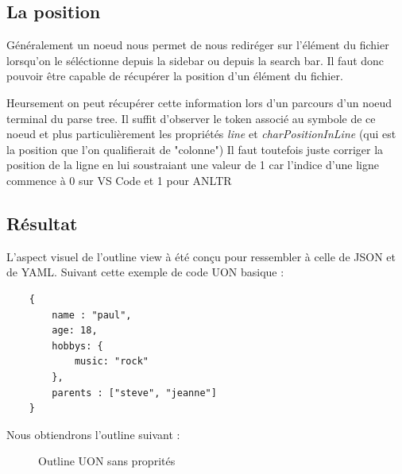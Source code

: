 \documentclass[
    iict, %
    il, %
]{heig-tb}
\begin{document}
\subsection{La position}

Généralement un noeud nous permet de nous rediréger sur l'élément du fichier lorsqu'on le séléctionne depuis la sidebar ou depuis la search bar. %
Il faut donc pouvoir être capable de récupérer la position d'un élément du fichier.

Heursement on peut récupérer cette information lors d'un parcours d'un noeud terminal du parse tree.
Il suffit d'observer le token associé au symbole de ce noeud et plus particulièrement les
propriétés \emph{line} et \emph{charPositionInLine} (qui est la position que l'on qualifierait de "colonne")
Il faut toutefois juste corriger la position de la ligne en lui soustraiant une valeur de 1 car l'indice d'une ligne commence à 0 sur VS Code et 1 pour ANLTR %

\subsection{Résultat}
L'aspect visuel de l'outline view à été conçu pour ressembler à celle de JSON et de YAML.
Suivant cette exemple de code UON basique :

\begin{lstlisting}
    {
        name : "paul",
        age: 18,
        hobbys: {
            music: "rock"
        },
        parents : ["steve", "jeanne"]
    }
\end{lstlisting}

Nous obtiendrons l'outline suivant :

\begin{figure}[!h]
    \begin{center}
    \end{center}
    \caption[Outline UON sans proprités]{\label{uon-payload-outline-without-properties} Outline UON sans proprités}
\end{figure}
\end{document}
